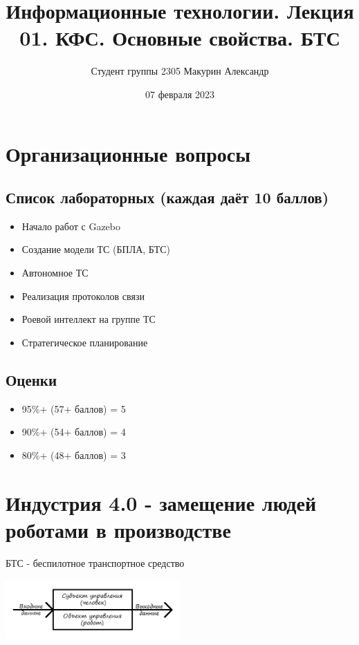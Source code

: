 \documentclass[12pt]{article}
\title{Информационные технологии. Лекция 01. КФС. Основные свойства. БТС}
\author{Студент группы 2305 Макурин Александр}
\date{07 февраля 2023}
\begin{document}
\maketitle
\begin{sloppypar}

    \section*{Организационные вопросы}
    \subsection*{Список лабораторных (каждая даёт 10 баллов)}
    \begin{itemize}
        \item Начало работ с Gazebo
        \item Создание модели ТС (БПЛА, БТС)
        \item Автономное ТС
        \item Реализация протоколов связи
        \item Роевой интеллект на группе ТС
        \item Стратегическое планирование
    \end{itemize}
    \subsection*{Оценки}
    \begin{itemize}
        \item 95\%+ (57+ баллов) = 5
        \item 90\%+ (54+ баллов) = 4
        \item 80\%+ (48+ баллов) = 3
    \end{itemize}

    \section*{Индустрия 4.0 - замещение людей роботами в производстве}

    БТС - беспилотное транспортное средство

    \includegraphics[width=0.5\textwidth]{graphics/СУ_ОУ.png}


\end{sloppypar}
\end{document}
